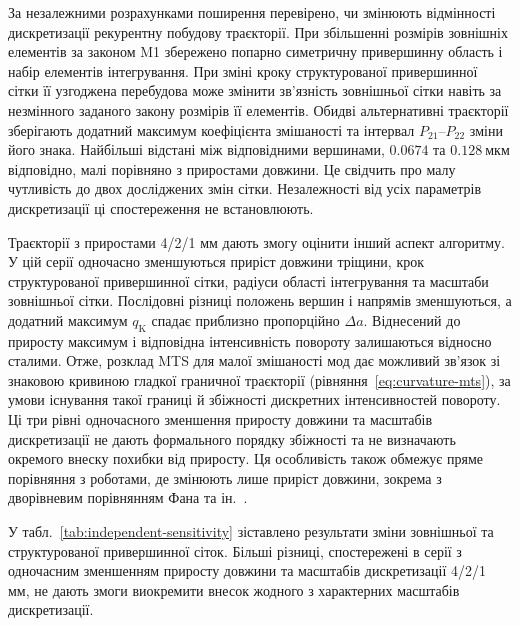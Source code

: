 \documentclass[a4paper,12pt]{article}
\begin{document}
За незалежними розрахунками поширення перевірено, чи змінюють відмінності дискретизації
рекурентну побудову траєкторії. При збільшенні розмірів зовнішніх елементів за законом M1
збережено попарно симетричну привершинну область і набір елементів інтегрування. При зміні кроку
структурованої привершинної сітки її узгоджена перебудова може змінити зв’язність зовнішньої
сітки навіть за незмінного заданого закону розмірів її елементів. Обидві альтернативні
траєкторії зберігають додатний максимум коефіцієнта змішаності та інтервал $P_{21}$--$P_{22}$ зміни його
знака. Найбільші відстані між відповідними вершинами, $0.0674$ та $0.128~\text{мкм}$ відповідно, малі порівняно з
приростами довжини. Це свідчить про малу чутливість до двох досліджених змін сітки. Незалежності
від усіх параметрів дискретизації ці спостереження не встановлюють.

Траєкторії з приростами 4/2/1 мм дають змогу оцінити інший аспект алгоритму. У цій серії
одночасно зменшуються приріст довжини тріщини, крок структурованої привершинної сітки, радіуси
області інтегрування та масштаби зовнішньої сітки. Послідовні різниці положень вершин і напрямів
зменшуються, а додатний максимум $q_{\mathrm{K}}$ спадає приблизно пропорційно $\Delta a$. Віднесений до приросту
максимум і відповідна інтенсивність повороту залишаються відносно сталими. Отже, розклад MTS для
малої змішаності мод дає можливий зв’язок зі знаковою кривиною гладкої граничної траєкторії
(рівняння~\eqref{eq:curvature-mts}), за умови існування такої границі й збіжності дискретних інтенсивностей повороту.
Ці три рівні одночасного зменшення приросту довжини та масштабів дискретизації не дають формального порядку збіжності та не визначають
окремого внеску похибки від приросту. Ця особливість також обмежує пряме порівняння з роботами,
де змінюють лише приріст довжини, зокрема з дворівневим порівнянням Фана та ін.~\cite{FangEtAl2020}.

У табл.~\ref{tab:independent-sensitivity} зіставлено результати зміни зовнішньої та структурованої привершинної сіток. Більші
різниці, спостережені в серії з одночасним зменшенням приросту довжини та масштабів дискретизації 4/2/1 мм, не дають змоги виокремити внесок
жодного з характерних масштабів дискретизації.
\end{document}
